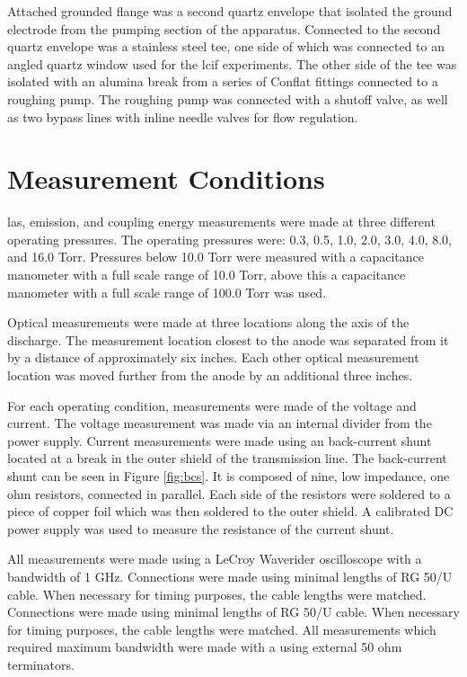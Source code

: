 Attached grounded flange was a second quartz envelope that isolated the
ground electrode from the pumping section of the apparatus. Connected to
the second quartz envelope was a stainless steel tee, one side of which
was connected to an angled quartz window used for the \acs{lcif}
experiments. The other side of the tee was isolated with an alumina
break from a series of Conflat fittings connected to a roughing pump.
The roughing pump was connected with a shutoff valve, as well as two
bypass lines with inline needle valves for flow regulation.

\section{Measurement Conditions}
\acs{las}, emission, and coupling energy measurements were made at three
different operating pressures. The operating pressures were: 0.3, 0.5,
1.0, 2.0, 3.0, 4.0, 8.0, and 16.0 Torr. Pressures below 10.0 Torr were
measured with a capacitance manometer with a full scale range of 10.0
Torr, above this a capacitance manometer with a full scale range of
100.0 Torr was used.

Optical measurements were made at three locations along the axis of the
discharge. The measurement location closest to the anode was separated
from it by a distance of approximately six inches. Each other optical
measurement location was moved further from the anode by an additional
three inches.

For each operating condition, measurements were made of the voltage and
current. The voltage measurement was made via an internal divider from
the power supply. Current measurements were made using an back-current
shunt located at a break in the outer shield of the transmission line.
The back-current shunt can be seen in Figure \ref{fig:bcs}. It is
composed of nine, low impedance, one ohm resistors, connected in
parallel. Each side of the resistors were soldered to a piece of copper
foil which was then soldered to the outer shield. A calibrated DC power
supply was used to measure the resistance of the current shunt.

All measurements were made using a LeCroy Waverider oscilloscope with a
bandwidth of 1 GHz. Connections were made using minimal lengths of RG
50/U cable. When necessary for timing purposes, the cable lengths were
matched.  Connections were made using minimal lengths of RG 50/U cable.
When necessary for timing purposes, the cable lengths were matched. All
measurements which required maximum bandwidth were made with a using
external 50 ohm terminators.

